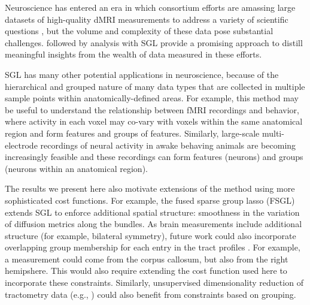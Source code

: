 \documentclass[10pt,letterpaper]{article}
\begin{document}
Neuroscience has entered an era in which consortium efforts are amassing
large datasets of high-quality dMRI measurements to address a variety of
scientific questions \cite{jernigan2016ping, jernigan2018abcd,
alexander2017open, Miller2016-hw, VanEssen2012}, but the volume and
complexity of these data pose substantial challenges.
 followed by
analysis with SGL provide a promising approach to distill meaningful insights
from the wealth of data measured in these efforts.

SGL has many other potential applications in neuroscience, because of the
hierarchical and grouped nature of many data types that are collected in
multiple sample points within anatomically-defined areas. For example, this
method may be useful to understand the relationship between fMRI recordings
and behavior, where activity in each voxel may co-vary with voxels within the
same anatomical region and form features and groups of features. Similarly,
large-scale multi-electrode recordings of neural activity in awake behaving
animals are becoming increasingly feasible \cite{steinmetz2018distributed,
Jun2017-gv} and these recordings can form features (neurons) and groups
(neurons within an anatomical region).

The results we present here also motivate extensions of the method using more
sophisticated cost functions. For example, the fused sparse group lasso
(FSGL) \cite{zhou2012} extends SGL to enforce additional spatial structure:
smoothness in the variation of diffusion metrics along the bundles. As brain
measurements include additional structure (for example, bilateral symmetry),
future work could also incorporate overlapping group membership for each
entry in the tract profiles \cite{Rao2014-xm}. For example, a measurement
could come from the corpus callosum, but also from the right hemipshere. This
would also require extending the cost function used here to incorporate these
constraints. Similarly, unsupervised dimensionality reduction of tractometry
data (e.g., \cite{chamberland2019dimensionality}) could also benefit from constraints
based on grouping.
\end{document}
